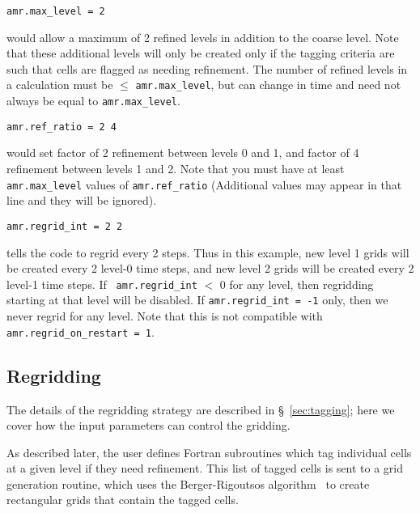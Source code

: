 \begin{lstlisting}
amr.max_level = 2 
\end{lstlisting}
would allow a maximum of 2 refined levels in addition to the coarse
level.  Note that these additional levels will only be created only if
the tagging criteria are such that cells are flagged as needing
refinement.  The number of refined levels in a calculation must be
$\leq$ {\tt amr.max\_level}, but can change in time and need not
always be equal to {\tt amr.max\_level}.  \newline
 
\begin{lstlisting}
amr.ref_ratio = 2 4 
\end{lstlisting}
would set factor of 2 refinement between levels 0 and 1, and factor of 4
refinement between levels 1 and 2.  Note that you must have at least
{\tt amr.max\_level} values of {\tt amr.ref\_ratio} (Additional values
may appear in that line and they will be ignored). \newline

\begin{lstlisting}
amr.regrid_int = 2 2
\end{lstlisting}
tells the code to regrid every 2 steps.  Thus in this example, new
level 1 grids will be created every 2 level-0 time steps, and new
level 2 grids will be created every 2 level-1 time steps. If {\tt
amr.regrid\_int} $<$ 0 for any level, then regridding starting at that
level will be disabled. If {\tt amr.regrid\_int = -1} only, then we
never regrid for any level. Note that this is not compatible with {\tt
amr.regrid\_on\_restart = 1}.


\subsection{Regridding}

The details of the regridding strategy are described in
\S~\ref{sec:tagging}; here we cover how the input parameters can
control the gridding.

As described later, the user defines Fortran subroutines which tag
individual cells at a given level if they need refinement.  This list
of tagged cells is sent to a grid generation routine, which uses the
Berger-Rigoutsos algorithm~\cite{br-refine} to create rectangular
grids that contain the tagged cells.

